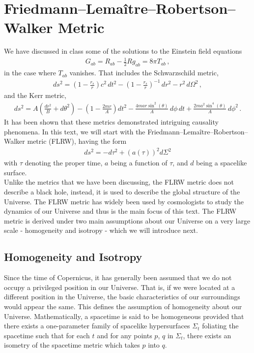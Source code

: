 \documentclass[11pt]{article}
\theoremstyle{break}
\theoremstyle{break}
\begin{document}
\newpage
\section{Friedmann–Lemaître–Robertson–Walker Metric}
We have discussed in class some of the solutions to the  Einstein field equations
\begin{align}
G_{ab} = R_{ab} - \frac{1}{2}R g_{ab} = 8\pi T_{ab}\,,
\end{align}
in the case where $T_{ab}$ vanishes. That includes the Schwarzschild metric, 
\begin{align}
ds^2 = \left( 1 - \frac{r_s}{r}\right) c^2 \, dt^2 - \left( 1 - \frac{r_s}{r}\right)^{-1}\, dr^2 - r^2 \, d\Omega^2\,,
\end{align}
and the Kerr metric,
\begin{align}
ds^2 = A\left( \frac{dr^2}{B} + d\theta^2\right) - \left( 1 - \frac{2mr}{A}\right) dt^2 - \frac{4mar \sin^2(\theta)}{A}\, d\phi \, dt + \frac{2ma^2 \sin^4(\theta)}{A}\, d\phi^2\,.
\end{align} 
It has been shown that these metrics demonstrated intriguing causality phenomena. In this text, we will start with the Friedmann–Lemaître–Robertson–Walker metric (FLRW), having the form
\begin{align}
ds^2 = -d\tau^2 + (a(\tau))^2 d\Sigma^2
\end{align}
with $\tau$ denoting the proper time, $a$ being a function of $\tau$, and $d$ being a spacelike surface. \\

Unlike the metrics that we have been discussing, the FLRW metric does not describe a black hole, instead, it is used to describe the global structure of the Universe. The FLRW metric has widely been used by cosmologists to study the dynamics of our Universe \cite{Hall, Nathalie, Kazuya, Suyu, Ishak, Valentino, Planck} and thus is the main focus of this text. The FLRW metric is derived under two main assumptions about our Universe on a very large scale - homogeneity and isotropy - which we will introduce next.\\

\subsection{Homogeneity and Isotropy}
Since the time of Copernicus, it has generally been assumed that we do not occupy a privileged position in our Universe. That is, if we were located at a different position in the Universe, the basic characteristics of our surroundings would appear the same. This defines the assumption of homogeneity about our Universe. Mathematically, a spacetime is said to be homogeneous provided that there exists a one-parameter family of spacelike hypersurfaces $\Sigma_t$ foliating the spacetime such that for each $t$ and for any points $p$, $q$ in $\Sigma_t$, there exists an isometry of the spacetime metric which takes $p$ into $q$.\\
\end{document}
